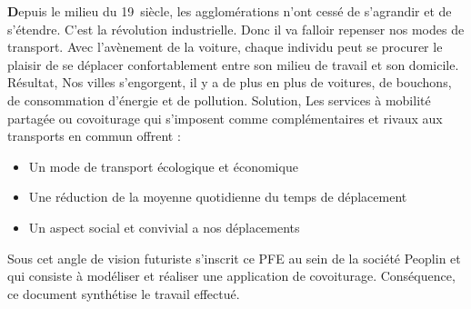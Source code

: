 
\begin{general}

\textbf{D}epuis le milieu du 19\ieme\ siècle, les agglomérations n’ont cessé de s’agrandir et de s’étendre. C’est la révolution industrielle. Donc il va falloir repenser nos modes de transport.\newline
Avec l’avènement de la voiture, chaque individu peut se procurer le plaisir de se déplacer confortablement entre son milieu de travail et son domicile.\newline
Résultat, Nos villes s’engorgent, il y a de plus en plus de voitures, de bouchons, de consommation d’énergie et de pollution.\newline
Solution, Les services à mobilité partagée ou covoiturage qui s’imposent comme complémentaires et rivaux aux transports en commun offrent :
\begin{itemize}
\item Un mode de transport écologique et économique
\item Une réduction de la moyenne quotidienne du temps de déplacement
\item Un aspect social et convivial a nos déplacements
\end{itemize}
Sous cet angle de vision futuriste s’inscrit ce PFE au sein de la société Peoplin et qui consiste à modéliser et réaliser une application de covoiturage.\newline
Conséquence, ce document synthétise le travail effectué.

\end{general}
